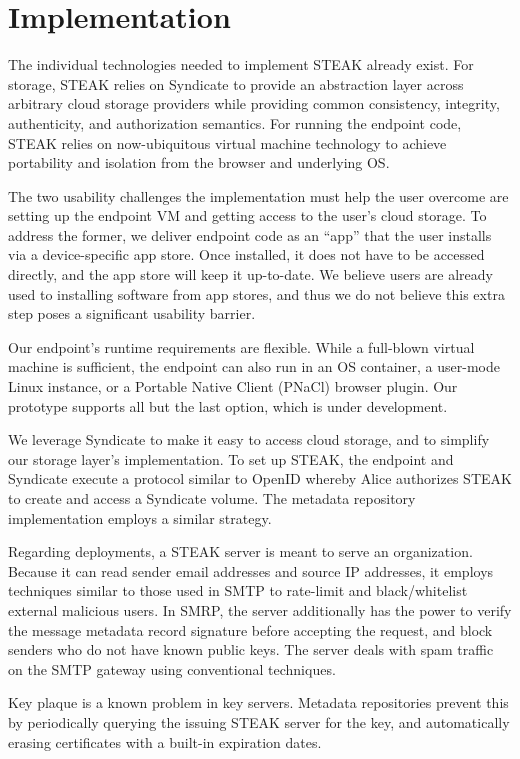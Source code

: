 \section{Implementation}

The individual technologies needed to implement STEAK already exist.  For storage, STEAK relies on Syndicate to provide an abstraction layer across arbitrary cloud storage providers while providing common consistency, integrity, authenticity, and authorization semantics.  For running the endpoint code, STEAK relies on now-ubiquitous virtual machine technology to achieve portability and isolation from the browser and underlying OS.

The two usability challenges the implementation must help the user overcome are setting up the endpoint VM and getting access to the user’s cloud storage.  To address the former, we deliver endpoint code as an “app” that the user installs via a device-specific app store.  Once installed, it does not have to be accessed directly, and the app store will keep it up-to-date.  We believe users are already used to installing software from app stores, and thus we do not believe this extra step poses a significant usability barrier.

Our endpoint’s runtime requirements are flexible.  While a full-blown virtual machine is sufficient, the endpoint can also run in an OS container, a user-mode Linux instance, or a Portable Native Client (PNaCl) browser plugin.  Our prototype supports all but the last option, which is under development.

We leverage Syndicate to make it easy to access cloud storage, and to simplify our storage layer’s implementation.  To set up STEAK, the endpoint and Syndicate execute a protocol similar to OpenID whereby Alice authorizes STEAK to create and access a Syndicate volume.  The metadata repository implementation employs a similar strategy.

Regarding deployments, a STEAK server is meant to serve an organization.  Because it can read sender email addresses and source IP addresses, it employs techniques similar to those used in SMTP to rate-limit and black/whitelist external malicious users.  In SMRP, the server additionally has the power to verify the message metadata record signature before accepting the request, and block senders who do not have known public keys.  The server deals with spam traffic on the SMTP gateway using conventional techniques.

Key plaque is a known problem in key servers.  Metadata repositories prevent this by periodically querying the issuing STEAK server for the key, and automatically erasing certificates with a built-in expiration dates.


